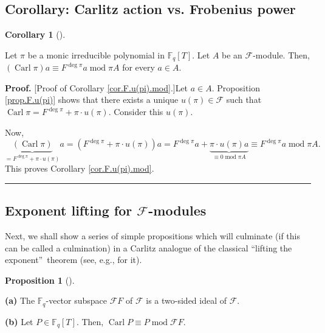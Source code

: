 \documentclass[numbers=enddot,12pt,final,onecolumn,notitlepage]{scrartcl}%
\theoremstyle{definition}
\newtheorem{prop}[theo]{Proposition}
\newenvironment{proposition}[1][]
{\begin{prop}[#1]\begin{leftbar}}
{\end{leftbar}\end{prop}}
\newtheorem{coro}[theo]{Corollary}
\newenvironment{corollary}[1][]
{\begin{coro}[#1]\begin{leftbar}}
{\end{leftbar}\end{coro}}
\newenvironment{proof}[1][Proof]{\noindent\textbf{#1.} }{\ \rule{0.5em}{0.5em}}
\begin{document}
\subsection{Corollary: Carlitz action vs. Frobenius power}

\begin{corollary}
\label{cor.F.u(pi).mod}Let $\pi$ be a monic irreducible polynomial in
$\mathbb{F}_{q}\left[  T\right]  $. Let $A$ be an $\mathcal{F}$-module. Then,
$\left(  \operatorname*{Carl}\pi\right)  a\equiv F^{\deg\pi}%
a\operatorname{mod}\pi A$ for every $a\in A$.
\end{corollary}

\begin{proof}
[Proof of Corollary \ref{cor.F.u(pi).mod}.]Let $a\in A$. Proposition
\ref{prop.F.u(pi)} shows that there exists a unique $u\left(  \pi\right)
\in\mathcal{F}$ such that $\operatorname*{Carl}\pi=F^{\deg\pi}+\pi\cdot
u\left(  \pi\right)  $. Consider this $u\left(  \pi\right)  $.

Now,%
\[
\underbrace{\left(  \operatorname*{Carl}\pi\right)  }_{=F^{\deg\pi}+\pi\cdot
u\left(  \pi\right)  }a=\left(  F^{\deg\pi}+\pi\cdot u\left(  \pi\right)
\right)  a=F^{\deg\pi}a+\underbrace{\pi\cdot u\left(  \pi\right)  a}%
_{\equiv0\operatorname{mod}\pi A}\equiv F^{\deg\pi}a\operatorname{mod}\pi A.
\]
This proves Corollary \ref{cor.F.u(pi).mod}.
\end{proof}

\subsection{Exponent lifting for $\mathcal{F}$-modules}

Next, we shall show a series of simple propositions which will culminate (if
this can be called a culmination) in a Carlitz analogue of the classical
\textquotedblleft lifting the exponent\textquotedblright\ theorem (see, e.g.,
\cite[version with solution (ancillary file), (12.349)]{reiner-hopf} for it).

\begin{proposition}
\label{prop.F.lift.CarlP-P}\textbf{(a)} The $\mathbb{F}_{q}$-vector subspace
$\mathcal{F}F$ of $\mathcal{F}$ is a two-sided ideal of $\mathcal{F}$.

\textbf{(b)} Let $P\in\mathbb{F}_{q}\left[  T\right]  $. Then,
$\operatorname*{Carl}P\equiv P\operatorname{mod}\mathcal{F}F$.
\end{proposition}
\end{document}

